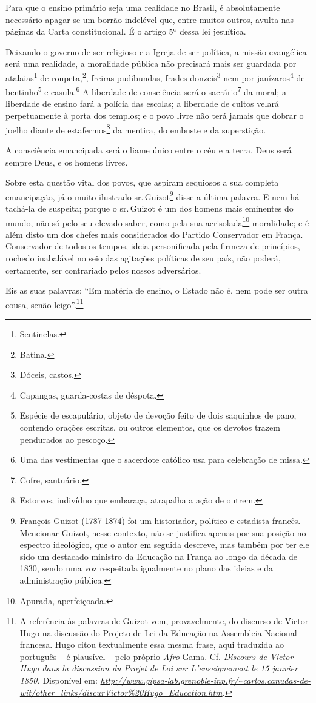 Para que o ensino primário seja uma realidade no Brasil, é absolutamente
necessário apagar-se um borrão indelével que, entre muitos outros,
avulta nas páginas da Carta constitucional. É o artigo 5º dessa lei
jesuítica.

Deixando o governo de ser religioso e a Igreja de ser política, a missão
evangélica será uma realidade, a moralidade pública não precisará mais
ser guardada por atalaias\footnote{Sentinelas.} de roupeta,\footnote{
  Batina.}, freiras pudibundas, frades donzeis\footnote{Dóceis,
  castos.} nem por janízaros\footnote{Capangas, guarda-costas de
  déspota.} de bentinho\footnote{Espécie de escapulário, objeto de
  devoção feito de dois saquinhos de pano, contendo orações escritas, ou
  outros elementos, que os devotos trazem pendurados ao pescoço.} e
casula.\footnote{Uma das vestimentas que o sacerdote católico usa para
  celebração de missa.} A liberdade de consciência será o
sacrário\footnote{Cofre, santuário.} da moral; a liberdade de ensino
fará a polícia das escolas; a liberdade de cultos velará perpetuamente à
porta dos templos; e o povo livre não terá jamais que dobrar o joelho
diante de estafermos\footnote{Estorvos, indivíduo que embaraça,
  atrapalha a ação de outrem.} da mentira, do embuste e da superstição.

A consciência emancipada será o liame único entre o céu e a terra. Deus
será sempre Deus, e os homens livres.

Sobre esta questão vital dos povos, que aspiram sequiosos a sua completa
emancipação, já o muito ilustrado sr.\,Guizot\footnote{François Guizot
  (1787-1874) foi um historiador, político e estadista francês.
  Mencionar Guizot, nesse contexto, não se justifica apenas por sua
  posição no espectro ideológico, que o autor em seguida descreve, mas
  também por ter ele sido um destacado ministro da Educação na França ao
  longo da década de 1830, sendo uma voz respeitada igualmente no plano
  das ideias e da administração pública.} disse a última palavra. E nem
há tachá-la de suspeita; porque o sr.\,Guizot é um dos homens mais
eminentes do mundo, não só pelo seu elevado saber, como pela sua
acrisolada\footnote{Apurada, aperfeiçoada.} moralidade; e é além disto
um dos chefes mais considerados do Partido Conservador em França.
Conservador de todos os tempos, ideia personificada pela firmeza de
princípios, rochedo inabalável no seio das agitações políticas de seu
país, não poderá, certamente, ser contrariado pelos nossos adversários.

Eis as suas palavras: ``Em matéria de ensino, o Estado não é, nem pode
ser outra cousa, senão leigo''.\footnote{A referência às palavras de
  Guizot vem, provavelmente, do discurso de Victor Hugo na discussão do
  Projeto de Lei da Educação na Assembleia Nacional francesa. Hugo citou
  textualmente essa mesma frase, aqui traduzida ao português -- é
  plausível -- pelo próprio \emph{Afro}-Gama. Cf. \emph{Discours de
  Victor Hugo dans la discussion du Projet de Loi sur L'enseignement le
  15 janvier 1850.} Disponível em:
  \emph{\url{http://www.gipsa-lab.grenoble-inp.fr/~carlos.canudas-de-wit/other_links/discurVictor\%20Hugo_Education.htm}.}}

